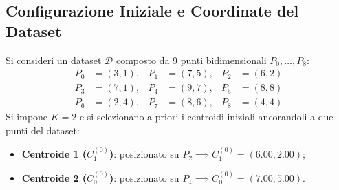 \FloatBarrier
\subsection{Configurazione Iniziale e Coordinate del Dataset}
Si consideri un dataset $\mathcal{D}$ composto da 9 punti bidimensionali $P_0, \dots, P_8$:
\begin{align}
P_0 &= (3, 1), & P_1 &= (7, 5), & P_2 &= (6, 2) \nonumber \\
P_3 &= (7, 1), & P_4 &= (9, 7), & P_5 &= (8, 8) \nonumber \\
P_6 &= (2, 4), & P_7 &= (8, 6), & P_8 &= (4, 4)
\end{align}
Si impone $K = 2$ e si selezionano a priori i centroidi iniziali ancorandoli a due punti del dataset:
\begin{itemize}
    \item \textbf{Centroide 1 ($C_1^{(0)}$)}: posizionato su $P_2 \implies C_1^{(0)} = (6.00, 2.00)$;
    \item \textbf{Centroide 2 ($C_0^{(0)}$)}: posizionato su $P_1 \implies C_0^{(0)} = (7.00, 5.00)$.
\end{itemize}

\FloatBarrier
